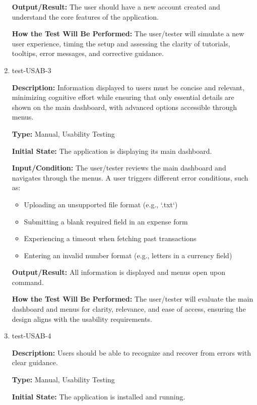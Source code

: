 \documentclass[12pt, titlepage]{article}
\begin{document}
\begin{enumerate}
\textbf{Output/Result:} The user should have a new account created and
understand the core features of the application.
					
\textbf{How the Test Will Be Performed:} The user/tester will simulate a new
user experience, timing the setup and assessing the clarity of tutorials,
tooltips, error messages, and corrective guidance.

\item{test-USAB-3\\}

\textbf{Description:} Information displayed to users must be concise and
relevant, minimizing cognitive effort while ensuring that only essential details
are shown on the main dashboard, with advanced options accessible through menus.

\textbf{Type:} Manual, Usability Testing
					
\textbf{Initial State:} The application is displaying its main dashboard.
					
\textbf{Input/Condition:} The user/tester reviews the main dashboard and
navigates through the menus. A user triggers different error conditions, such as:
  \begin{itemize}
      \item Uploading an unsupported file format (e.g., `.txt`)
      \item Submitting a blank required field in an expense form
      \item Experiencing a timeout when fetching past transactions
      \item Entering an invalid number format (e.g., letters in a currency field)
  \end{itemize}
					
\textbf{Output/Result:} All information is displayed and menus open upon
command.
					
\textbf{How the Test Will Be Performed:} The user/tester will evaluate the main
dashboard and menus for clarity, relevance, and ease of access, ensuring the
design aligns with the usability requirements.

\item{test-USAB-4\\}

\textbf{Description:} Users should be able to recognize and recover from errors with clear guidance.

\textbf{Type:} Manual, Usability Testing
					
\textbf{Initial State:} The application is installed and running.
					

\end{enumerate}
\end{document}
